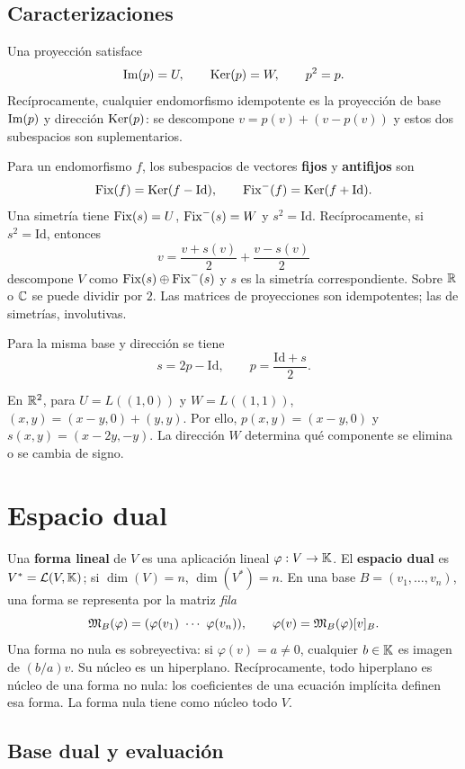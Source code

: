 \subsection*{Caracterizaciones}

Una proyección satisface
\[
 \operatorname{Im}(p)=U,\qquad\operatorname{Ker}(p)=W,\qquad p^2=p.
\]
Recíprocamente, cualquier endomorfismo idempotente es la proyección
de base $\operatorname{Im}(p)$ y dirección $\operatorname{Ker}(p)$: se descompone
$v=p(v)+(v-p(v))$ y estos dos subespacios son suplementarios.

Para un endomorfismo $f$, los subespacios de vectores \textbf{fijos}
y \textbf{antifijos} son
\[
 \operatorname{Fix}(f)=\operatorname{Ker}(f-\mathrm{Id}),\qquad
 \operatorname{Fix}^{-}(f)=\operatorname{Ker}(f+\mathrm{Id}).
\]
Una simetría tiene $\operatorname{Fix}(s)=U$, $\operatorname{Fix}^{-}(s)=W$ y $s^2=\mathrm{Id}$.
Recíprocamente, si $s^2=\mathrm{Id}$, entonces
\[
 v=\frac{v+s(v)}2+\frac{v-s(v)}2
\]
descompone $V$ como $\operatorname{Fix}(s)\oplus\operatorname{Fix}^{-}(s)$ y $s$ es la simetría
correspondiente. Sobre $\mathbb{R}$ o $\mathbb{C}$ se puede dividir por $2$.
Las matrices de proyecciones son idempotentes; las de simetrías, involutivas.

Para la misma base y dirección se tiene
\[
 s=2p-\mathrm{Id},\qquad p=\frac{\mathrm{Id}+s}{2}.
\]

\begin{ejemplo}
En $\mathbb{R}^2$, para $U=L((1,0))$ y $W=L((1,1))$,
$(x,y)=(x-y,0)+(y,y)$. Por ello,
$p(x,y)=(x-y,0)$ y $s(x,y)=(x-2y,-y)$.
La dirección $W$ determina qué componente se elimina o se cambia de signo.
\end{ejemplo}

\section{Espacio dual}
\label{sec:dual}

Una \textbf{forma lineal} de $V$ es una aplicación lineal $\varphi:V\to\mathbb{K}$.
El \textbf{espacio dual} es $V^*=\mathcal{L}(V,\mathbb{K})$; si $\dim(V)=n$,
$\dim(V^*)=n$. En una base $B=(v_1,\ldots,v_n)$, una forma se representa
por la matriz \emph{fila}
\[
 \M_B(\varphi)=(\varphi(v_1)\ \cdots\ \varphi(v_n)),\qquad
 \varphi(v)=\M_B(\varphi)\coord{v}{B}.
\]
Una forma no nula es sobreyectiva: si $\varphi(v)=a\ne0$, cualquier
$b\in\mathbb{K}$ es imagen de $(b/a)v$. Su núcleo es un hiperplano.
Recíprocamente, todo hiperplano es núcleo de una forma no nula:
los coeficientes de una ecuación implícita definen esa forma.
La forma nula tiene como núcleo todo $V$.

\subsection*{Base dual y evaluación}

